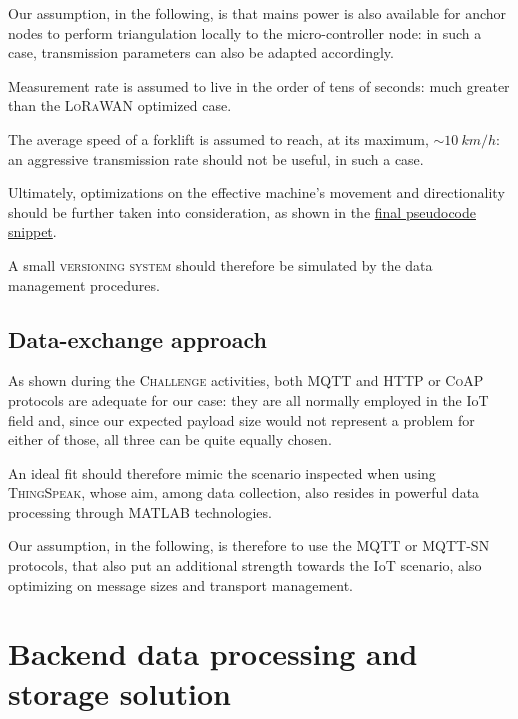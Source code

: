 \documentclass[a4paper,11pt]{article} %
\begin{document}
\medskip

Our assumption, in the following, is that mains power is also available for anchor nodes to perform triangulation locally to the micro-controller node: in such a case, transmission parameters can also be adapted accordingly.

\smallskip

Measurement rate is assumed to live in the order of tens of seconds: much greater than the \textsc{LoRaWAN} optimized case.

\smallskip

The average speed of a forklift is assumed to reach, at its maximum, $\sim 10\ km/h$: an aggressive transmission rate should not be useful, in such a case.

\smallskip

Ultimately, optimizations on the effective machine's movement and directionality should be further taken into consideration, as shown in the \hyperref[pseudocode]{final pseudocode snippet}.

\smallskip

A small \textsc{versioning system} should therefore be simulated by the data management procedures.

\subsection{Data-exchange approach}\label{data-exchange}

As shown during the \textsc{Challenge} activities, both \textsc{MQTT} and \textsc{HTTP} or \textsc{CoAP} protocols are adequate for our case: they are all normally employed in the IoT field and, since our expected payload size would not represent a problem for either of those, all three can be quite equally chosen.

\smallskip

An ideal fit should therefore mimic the scenario inspected when using \textsc{ThingSpeak}, whose aim, among data collection, also resides in powerful data processing through \textsc{MATLAB} technologies.

\smallskip

Our assumption, in the following, is therefore to use the \textsc{MQTT} or \textsc{MQTT-SN} protocols, that also put an additional strength towards the IoT scenario, also optimizing on message sizes and transport management.

\section{Backend data processing and storage solution}
\end{document}

